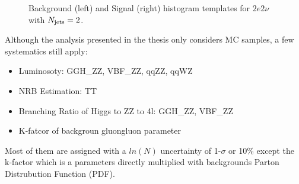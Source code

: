 \begin{figure}[htb]
    \begin{center}
    \end{center}
    \caption{Background (left) and Signal (right) histogram templates for $2e2\nu$ with $N_\mathrm{jets} = 2$.}
    \label{fig:templates_demo}
\end{figure}

Although the analysis presented in the thesis only considers MC samples, a few systematics still apply:
\begin{itemize}
    \item Luminosoty: GGH\_ZZ, VBF\_ZZ, qqZZ, qqWZ
    \item NRB Estimation: TT
    \item Branching Ratio of Higgs to ZZ to 4l: GGH\_ZZ, VBF\_ZZ
    \item K-fatcor of backgroun gluongluon parameter
\end{itemize}
Most of them are assigned with a $ln(N)$ uncertainty of 1-$\sigma$ or 10\% except the k-factor
which is a parameters directly multiplied with backgrounds Parton Distrubution Function (PDF).
